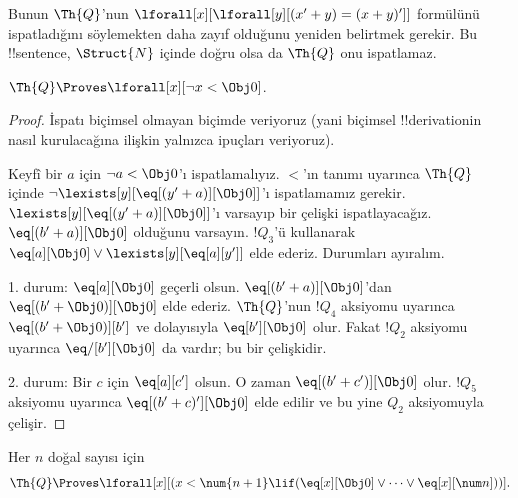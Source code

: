 Bunun $\Th{Q}$'nun
$\lforall[x][\lforall[y][(x'+y)=(x+y)']]$ formülünü ispatladığını
söylemekten daha zayıf olduğunu yeniden belirtmek gerekir. Bu !!{sentence},
$\Struct{N}$ içinde doğru olsa da $\Th{Q}$ onu ispatlamaz.

\begin{lem}
$\Th{Q} \Proves \lforall[x][\lnot x < \Obj 0]$.
\end{lem}

\begin{proof}
İspatı biçimsel olmayan biçimde veriyoruz (yani biçimsel !!{derivation}{}in
nasıl kurulacağına ilişkin yalnızca ipuçları veriyoruz).

Keyfî bir $a$ için $\lnot a<\Obj 0$'ı ispatlamalıyız. $<$'ın tanımı
uyarınca $\Th{Q}$ içinde
$\lnot\lexists[y][\eq[(y'+a)][\Obj 0]]$'ı ispatlamamız gerekir.
$\lexists[y][\eq[(y'+a)][\Obj 0]]$'ı varsayıp bir çelişki ispatlayacağız.
$\eq[(b'+a)][\Obj 0]$ olduğunu varsayın. $!Q_3$'ü kullanarak
$\eq[a][\Obj 0]\lor\lexists[y][\eq[a][y']]$ elde ederiz. Durumları ayıralım.

1. durum: $\eq[a][\Obj 0]$ geçerli olsun. $\eq[(b'+a)][\Obj 0]$'dan
$\eq[(b'+\Obj 0)][\Obj 0]$ elde ederiz. $\Th{Q}$'nun $!Q_4$ aksiyomu
uyarınca $\eq[(b'+\Obj 0)][b']$ ve dolayısıyla $\eq[b'][\Obj 0]$ olur.
Fakat $!Q_2$ aksiyomu uyarınca $\eq/[b'][\Obj 0]$ da vardır; bu bir
çelişkidir.

2. durum: Bir $c$ için $\eq[a][c']$ olsun. O zaman
$\eq[(b'+c')][\Obj 0]$ olur. $!Q_5$ aksiyomu uyarınca
$\eq[(b'+c)'][\Obj 0]$ elde edilir ve bu yine $Q_2$ aksiyomuyla çelişir.
\end{proof}

\begin{lem}
Her $n$ doğal sayısı için
  \[
  \Th{Q} \Proves
  \lforall[x][(x < \num {n+1} \lif (\eq[x][\Obj 0] \lor \dots \lor
    \eq[x][\num n]))].
  \]
\end{lem}

